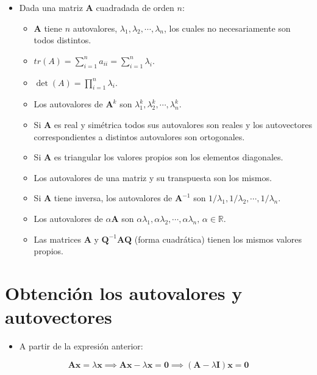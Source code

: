 \documentclass[openany]{book}
\providecommand{\tightlist}{%
  \setlength{\itemsep}{0pt}\setlength{\parskip}{0pt}}
\begin{document}
\begin{itemize}
\item
  Dada una matriz \(\textbf{A}\) cuadradada de orden \(n\):

  \begin{itemize}
  \tightlist
  \item
    \(\textbf{A}\) tiene \(n\) autovalores, \(\lambda_1, \lambda_2, \cdots, \lambda_n\), los cuales no necesariamente son todos distintos.
  \item
    \(tr(A) = \sum_{i=1}^n a_{ii} = \sum_{i=1}^n \lambda_{i}\).
  \item
    \(\det(A) = \prod_{i=1}^n \lambda_{i}\).
  \item
    Los autovalores de \(\textbf{A}^k\) son \(\lambda_1^k, \lambda_2^k, \cdots, \lambda_n^k\).
  \item
    Si \(\textbf{A}\) es real y simétrica todos sus autovalores son reales y los autovectores correspondientes a distintos autovalores son ortogonales.
  \item
    Si \(\textbf{A}\) es triangular los valores propios son los elementos diagonales.
  \item
    Los autovalores de una matriz y su transpuesta son los mismos.
  \item
    Si \(\textbf{A}\) tiene inversa, los autovalores de \(\textbf{A}^{-1}\) son \(1/\lambda_1, 1/\lambda_2, \cdots, 1/\lambda_n\).
  \item
    Los autovalores de \(\alpha \textbf{A}\) son \(\alpha \lambda_1, \alpha \lambda_2, \cdots, \alpha \lambda_n, \, \alpha \in \mathbb{R}\).
  \item
    Las matrices \(\textbf{A}\) y \(\textbf{Q}^{-1}\textbf{AQ}\) (forma cuadrática) tienen los mismos valores propios.
  \end{itemize}
\end{itemize}

\hypertarget{obtenciuxf3n-los-autovalores-y-autovectores}{%
\section{Obtención los autovalores y autovectores}\label{obtenciuxf3n-los-autovalores-y-autovectores}}

\begin{itemize}
\tightlist
\item
  A partir de la expresión anterior:
\end{itemize}

\[
\textbf{Ax} = \lambda \textbf{x} \implies \textbf{Ax} - \lambda \textbf{x} = \textbf{0} \implies (\textbf{A} - \lambda \textbf{I}) \textbf{x} = \textbf{0} 
\]
\end{document}
